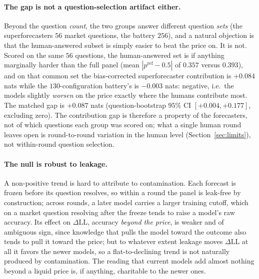 \documentclass[11pt]{article}
\begin{document}
\paragraph{The gap is not a question-selection artifact either.} Beyond the question \emph{count}, the two groups answer different question \emph{sets} (the superforecasters $56$ market questions, the battery $256$), and a natural objection is that the human-answered subset is simply easier to beat the price on. It is not. Scored on the same $56$ questions, the human-answered set is if anything marginally harder than the full panel (mean $|p^{\mathrm{ref}}-0.5|$ of $0.357$ versus $0.393$), and on that common set the bias-corrected superforecaster contribution is $+0.084$ nats while the $130$-configuration battery's is $-0.003$ nats: negative, i.e.\ the models slightly \emph{worsen} on the price exactly where the humans contribute most. The matched gap is $+0.087$ nats (question-bootstrap $95\%$ CI $[+0.004,+0.177]$, excluding zero). The contribution gap is therefore a property of the forecasters, not of which questions each group was scored on; what a single human round leaves open is round-to-round variation in the human level (Section~\ref{sec:limits}), not within-round question selection.

\paragraph{The null is robust to leakage.} A non-positive trend is hard to attribute to contamination. Each forecast is frozen before its question resolves, so within a round the panel is leak-free by construction; across rounds, a later model carries a larger training cutoff, which on a market question resolving after the freeze tends to raise a model's raw accuracy. Its effect on $\Delta\mathrm{LL}$, accuracy \emph{beyond the price}, is weaker and of ambiguous sign, since knowledge that pulls the model toward the outcome also tends to pull it toward the price; but to whatever extent leakage moves $\Delta\mathrm{LL}$ at all it favors the newer models, so a flat-to-declining trend is not naturally produced by contamination. The reading that current models add almost nothing beyond a liquid price is, if anything, charitable to the newer ones.
\end{document}
